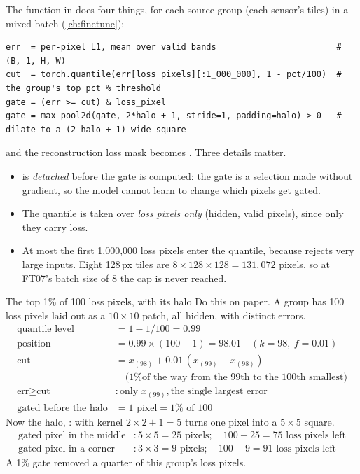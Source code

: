The function  in  does four
things, for each source group (each sensor's tiles) in a mixed batch (\cref{ch:finetune}):
\begin{lstlisting}
err  = per-pixel L1, mean over valid bands                        # (B, 1, H, W)
cut  = torch.quantile(err[loss pixels][:1_000_000], 1 - pct/100)  # the group's top pct % threshold
gate = (err >= cut) & loss_pixel
gate = max_pool2d(gate, 2*halo + 1, stride=1, padding=halo) > 0   # dilate to a (2 halo + 1)-wide square
\end{lstlisting}
and the reconstruction loss mask becomes . Three details matter.
\begin{itemize}
\item {} is \emph{detached} before the gate is computed: the gate is a selection made without
  gradient, so the model cannot learn to change which pixels get gated.
\item The quantile is taken over \emph{loss pixels only} (hidden, valid pixels), since only they carry loss.
\item At most the first 1,000,000 loss pixels enter the quantile, because  rejects very
  large inputs. Eight 128\,px tiles are $8\times128\times128=131{,}072$ pixels, so at FT07's batch size of 8
  the cap is never reached.
\end{itemize}

\begin{worked}[label={we:decoderwork:quantile}]{The top 1\% of 100 loss pixels, with its halo}
Do this on paper. A group has 100 loss pixels laid out as a $10\times10$ patch, all hidden, with distinct
errors.
\begin{align*}
\text{quantile level} &= 1-1/100 = 0.99\\
\text{position} &= 0.99\times(100-1) = 98.01 \quad(k=98,\ f=0.01)\\
\text{cut} &= x_{(98)} + 0.01\,(x_{(99)}-x_{(98)})\\
&\phantom{=}\ \text{(1\% of the way from the 99th to the 100th smallest)}\\
\text{err}\ge\text{cut} &: \text{only } x_{(99)}, \text{the single largest error}\\
\text{gated before the halo} &= 1 \text{ pixel} = 1\% \text{ of } 100
\end{align*}
Now the halo, :  with kernel $2\times2+1=5$ turns one pixel into a
$5\times5$ square.
\begin{align*}
\text{gated pixel in the middle} &: 5\times5 = 25 \text{ pixels};\quad 100-25 = 75 \text{ loss pixels left}\\
\text{gated pixel in a corner} &: 3\times3 = 9 \text{ pixels};\quad 100-9 = 91 \text{ loss pixels left}
\end{align*}
A 1\% gate removed a quarter of this group's loss pixels.
\end{worked}

